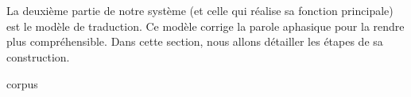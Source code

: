 \section{}

La deuxième partie de notre système (et celle qui réalise sa fonction principale) est le modèle de traduction.
Ce modèle corrige la parole aphasique pour la rendre plus compréhensible.
Dans cette section, nous allons détailler les étapes de sa construction.

{corpus}